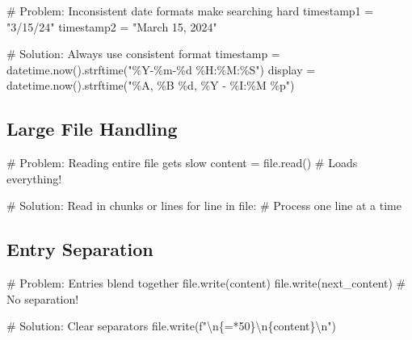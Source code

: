 \documentclass[
  letterpaper,
  DIV=11,
  numbers=noendperiod,
  oneside]{scrreprt}
\newenvironment{Shaded}{}{}
\newcommand{\BuiltInTok}[1]{\textcolor[rgb]{0.84,0.23,0.29}{#1}}
\newcommand{\CharTok}[1]{\textcolor[rgb]{0.01,0.18,0.38}{#1}}
\newcommand{\CommentTok}[1]{\textcolor[rgb]{0.42,0.45,0.49}{#1}}
\newcommand{\ControlFlowTok}[1]{\textcolor[rgb]{0.84,0.23,0.29}{#1}}
\newcommand{\DecValTok}[1]{\textcolor[rgb]{0.00,0.36,0.77}{#1}}
\newcommand{\KeywordTok}[1]{\textcolor[rgb]{0.84,0.23,0.29}{#1}}
\newcommand{\NormalTok}[1]{\textcolor[rgb]{0.14,0.16,0.18}{#1}}
\newcommand{\OperatorTok}[1]{\textcolor[rgb]{0.14,0.16,0.18}{#1}}
\newcommand{\SpecialCharTok}[1]{\textcolor[rgb]{0.00,0.36,0.77}{#1}}
\newcommand{\SpecialStringTok}[1]{\textcolor[rgb]{0.01,0.18,0.38}{#1}}
\newcommand{\StringTok}[1]{\textcolor[rgb]{0.01,0.18,0.38}{#1}}
\begin{document}
\begin{Shaded}
\begin{Highlighting}[]
\CommentTok{\# Problem: Inconsistent date formats make searching hard}
\NormalTok{timestamp1 }\OperatorTok{=} \StringTok{"3/15/24"}
\NormalTok{timestamp2 }\OperatorTok{=} \StringTok{"March 15, 2024"}

\CommentTok{\# Solution: Always use consistent format}
\NormalTok{timestamp }\OperatorTok{=}\NormalTok{ datetime.now().strftime(}\StringTok{"\%Y{-}\%m{-}}\SpecialCharTok{\%d}\StringTok{ \%H:\%M:\%S"}\NormalTok{)}
\NormalTok{display }\OperatorTok{=}\NormalTok{ datetime.now().strftime(}\StringTok{"\%A, \%B }\SpecialCharTok{\%d}\StringTok{, \%Y {-} \%I:\%M \%p"}\NormalTok{)}
\end{Highlighting}
\end{Shaded}

\subsection{Large File Handling}\label{large-file-handling}

\begin{Shaded}
\begin{Highlighting}[]
\CommentTok{\# Problem: Reading entire file gets slow}
\NormalTok{content }\OperatorTok{=} \BuiltInTok{file}\NormalTok{.read()  }\CommentTok{\# Loads everything!}

\CommentTok{\# Solution: Read in chunks or lines}
\ControlFlowTok{for}\NormalTok{ line }\KeywordTok{in} \BuiltInTok{file}\NormalTok{:}
    \CommentTok{\# Process one line at a time}
\end{Highlighting}
\end{Shaded}

\subsection{Entry Separation}\label{entry-separation}

\begin{Shaded}
\begin{Highlighting}[]
\CommentTok{\# Problem: Entries blend together}
\BuiltInTok{file}\NormalTok{.write(content)}
\BuiltInTok{file}\NormalTok{.write(next\_content)  }\CommentTok{\# No separation!}

\CommentTok{\# Solution: Clear separators}
\BuiltInTok{file}\NormalTok{.write(}\SpecialStringTok{f"}\CharTok{\textbackslash{}n}\SpecialCharTok{\{}\StringTok{\textquotesingle{}=\textquotesingle{}}\OperatorTok{*}\DecValTok{50}\SpecialCharTok{\}}\CharTok{\textbackslash{}n}\SpecialCharTok{\{}\NormalTok{content}\SpecialCharTok{\}}\CharTok{\textbackslash{}n}\SpecialStringTok{"}\NormalTok{)}
\end{Highlighting}
\end{Shaded}
\end{document}
